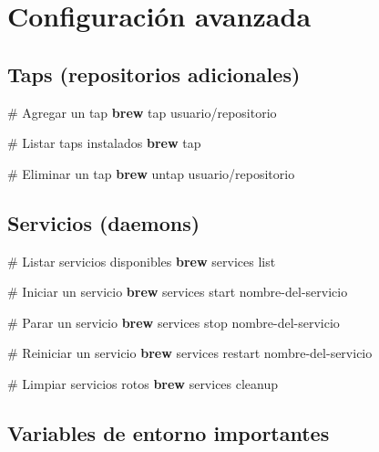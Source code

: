 \documentclass[
  11pt,
  letterpaper,
  oneside,
  openany]{scrbook}
\newenvironment{Shaded}{}{}
\newcommand{\CommentTok}[1]{\textcolor[rgb]{0.42,0.45,0.49}{#1}}
\newcommand{\ExtensionTok}[1]{\textcolor[rgb]{0.84,0.23,0.29}{\textbf{#1}}}
\newcommand{\NormalTok}[1]{\textcolor[rgb]{0.14,0.16,0.18}{#1}}
\begin{document}
\section{Configuración avanzada}\label{configuraciuxf3n-avanzada-2}

\subsection{Taps (repositorios
adicionales)}\label{taps-repositorios-adicionales}

\begin{Shaded}
\begin{Highlighting}[]
\CommentTok{\# Agregar un tap}
\ExtensionTok{brew}\NormalTok{ tap usuario/repositorio}

\CommentTok{\# Listar taps instalados}
\ExtensionTok{brew}\NormalTok{ tap}

\CommentTok{\# Eliminar un tap}
\ExtensionTok{brew}\NormalTok{ untap usuario/repositorio}
\end{Highlighting}
\end{Shaded}

\subsection{Servicios (daemons)}\label{servicios-daemons}

\begin{Shaded}
\begin{Highlighting}[]
\CommentTok{\# Listar servicios disponibles}
\ExtensionTok{brew}\NormalTok{ services list}

\CommentTok{\# Iniciar un servicio}
\ExtensionTok{brew}\NormalTok{ services start nombre{-}del{-}servicio}

\CommentTok{\# Parar un servicio}
\ExtensionTok{brew}\NormalTok{ services stop nombre{-}del{-}servicio}

\CommentTok{\# Reiniciar un servicio}
\ExtensionTok{brew}\NormalTok{ services restart nombre{-}del{-}servicio}

\CommentTok{\# Limpiar servicios rotos}
\ExtensionTok{brew}\NormalTok{ services cleanup}
\end{Highlighting}
\end{Shaded}

\subsection{Variables de entorno
importantes}\label{variables-de-entorno-importantes}
\end{document}
